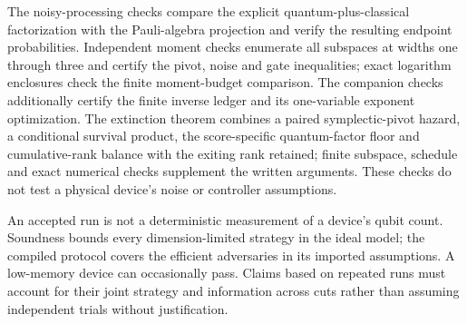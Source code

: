 \documentclass[11pt,a4paper]{article}
\begin{document}
The noisy-processing checks compare the explicit quantum-plus-classical factorization with the Pauli-algebra projection and verify the resulting endpoint probabilities. Independent moment checks enumerate all subspaces at widths one through three and certify the pivot, noise and gate inequalities; exact logarithm enclosures check the finite moment-budget comparison. The companion checks additionally certify the finite inverse ledger and its one-variable exponent optimization. The extinction theorem combines a paired symplectic-pivot hazard, a conditional survival product, the score-specific quantum-factor floor and cumulative-rank balance with the exiting rank retained; finite subspace, schedule and exact numerical checks supplement the written arguments. These checks do not test a physical device's noise or controller assumptions.

An accepted run is not a deterministic measurement of a device's qubit count. Soundness bounds every dimension-limited strategy in the ideal model; the compiled protocol covers the efficient adversaries in its imported assumptions. A low-memory device can occasionally pass. Claims based on repeated runs must account for their joint strategy and information across cuts rather than assuming independent trials without justification.
\end{document}
